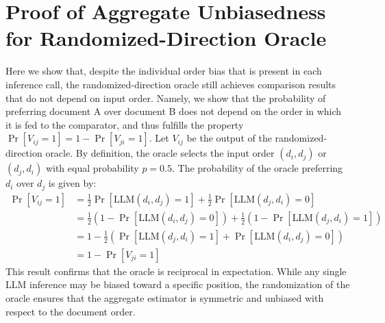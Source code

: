 \documentclass{llmxive}
\begin{document}
\section{Proof of Aggregate Unbiasedness for Randomized-Direction Oracle}
\label{sec:unbiased-proof}
Here we show that, despite the individual order bias that is present in each inference call, the randomized-direction oracle still achieves comparison results that do not depend on input order. Namely, we show that the probability of preferring document A over document B does not depend on the order in which it is fed to the comparator, and thus fulfills the property $\Pr[V_{ij}=1] = 1 - \Pr[V_{ji}=1]$. Let $V_{ij}$ be the output of the randomized-direction oracle. By definition, the oracle selects the input order $(d_i, d_j)$ or $(d_j, d_i)$ with equal probability $p=0.5$. The probability of the oracle preferring $d_i$ over $d_j$ is given by:
\begin{align*}
    \Pr[V_{ij}=1] &= \frac{1}{2} \Pr[\text{LLM}(d_i, d_j) = 1] + \frac{1}{2} \Pr[\text{LLM}(d_j, d_i) = 0] \\
    &= \frac{1}{2} \left( 1 - \Pr[\text{LLM}(d_i, d_j) = 0] \right) + \frac{1}{2} \left( 1 - \Pr[\text{LLM}(d_j, d_i) = 1] \right) \\
    &= 1 - \frac{1}{2} \left( \Pr[\text{LLM}(d_j, d_i) = 1] + \Pr[\text{LLM}(d_i, d_j) = 0] \right) \\
    &= 1 - \Pr[V_{ji}=1]
\end{align*}
This result confirms that the oracle is reciprocal in expectation. While any single LLM inference may be biased toward a specific position, the randomization of the oracle ensures that the aggregate estimator is symmetric and unbiased with respect to the document order.

\FloatBarrier
\end{document}
